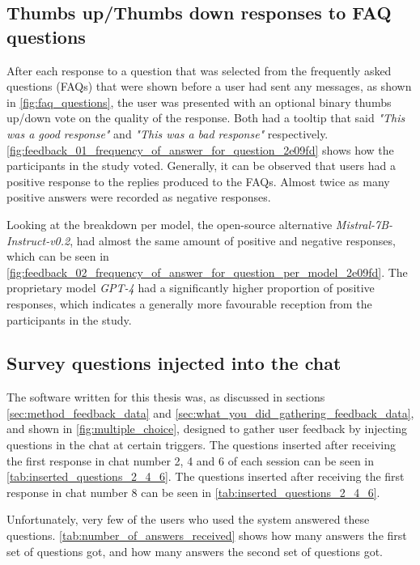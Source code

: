 \subsection{Thumbs up/Thumbs down responses to FAQ questions}


After each response to a question that was selected from the frequently asked questions (FAQs) that were shown before a user had sent any messages, as shown in \autoref{fig:faq_questions}, the user was presented with an optional binary thumbs up/down vote on the quality of the response. Both had a tooltip that said \textit{"This was a good response"} and \textit{"This was a bad response"} respectively. \autoref{fig:feedback_01_frequency_of_answer_for_question_2e09fd} shows how the participants in the study voted. Generally, it can be observed that users had a positive response to the replies produced to the FAQs. Almost twice as many positive answers were recorded as negative responses.


Looking at the breakdown per model, the open-source alternative \textit{Mistral-7B-Instruct-v0.2}, had almost the same amount of positive and negative responses, which can be seen in \autoref{fig:feedback_02_frequency_of_answer_for_question_per_model_2e09fd}. The proprietary model \textit{GPT-4} had a significantly higher proportion of positive responses, which indicates a generally more favourable reception from the participants in the study.








\subsection{Survey questions injected into the chat}


The software written for this thesis was, as discussed in sections \ref{sec:method_feedback_data} and \ref{sec:what_you_did_gathering_feedback_data}, and shown in \autoref{fig:multiple_choice}, designed to gather user feedback by injecting questions in the chat at certain triggers. The questions inserted after receiving the first response in chat number 2, 4 and 6 of each session can be seen in \autoref{tab:inserted_questions_2_4_6}. The questions inserted after receiving the first response in chat number 8 can be seen in \autoref{tab:inserted_questions_2_4_6}.


Unfortunately, very few of the users who used the system answered these questions. \autoref{tab:number_of_answers_received} shows how many answers the first set of questions got, and how many answers the second set of questions got.


